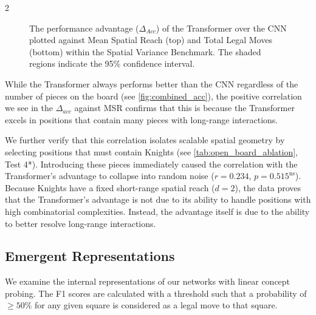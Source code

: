 \documentclass[a4paper,10pt]{article}
\begin{document}
\begin{multicols*}{2}
\begin{figure}[H]
    
    \caption{The performance advantage ($\Delta_{Acc}$) of the Transformer over the CNN plotted against Mean Spatial Reach (top) and Total Legal Moves (bottom) within the Spatial Variance Benchmark. The shaded regions indicate the 95\% confidence interval.}
    \label{fig:msr_scatter}
    \vspace{-1.5em}
\end{figure}

While the Transformer always performs better than the CNN regardless of the number of pieces on the board (see \autoref{fig:combined_acc}), the positive correlation we see in the $\Delta_{acc}$ against MSR confirms that this is because the Transformer excels in positions that contain many pieces with long-range interactions.

We further verify that this correlation isolates scalable spatial geometry by selecting positions that must contain Knights (see \autoref{tab:open_board_ablation}, Test 4*). Introducing these pieces immediately caused the correlation with the Transformer's advantage to collapse into random noise ($r = 0.234$, $p =  0.515^{\text{ns}}$). Because Knights have a fixed short-range spatial reach ($d=2$), the data proves that the Transformer's advantage is not due to its ability to handle positions with high combinatorial complexities. Instead, the advantage itself is due to the ability to better resolve long-range interactions.

\subsection{Emergent Representations}
We examine the internal representations of our networks with linear concept probing. The F1 scores are calculated with a threshold such that a probability of $\geq 50\%$ for any given square is considered as a legal move to that square.


\end{multicols*}
\end{document}
